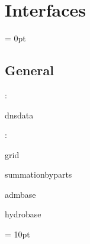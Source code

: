 
\section{Interfaces} 


\parskip = 0pt

\vspace{3mm} \subsection*{General}

: 

dnsdata
\vspace{2mm}

: 

grid

summationbyparts

admbase

hydrobase
\vspace{2mm}

\vspace{5mm}\parskip = 10pt 
